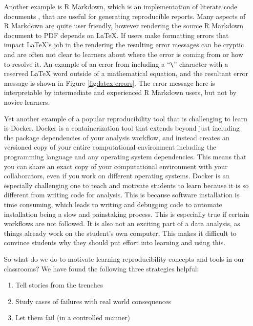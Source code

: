 \documentclass[
  12 pt,
]{paper}
\providecommand{\tightlist}{%
  \setlength{\itemsep}{0pt}\setlength{\parskip}{0pt}}
\begin{document}
Another example is R Markdown,
which is an implementation of literate code documents \autocite{knuth1984literate},
that are useful for generating reproducible reports.
Many aspects of R Markdown are quite user friendly,
however rendering the source R Markdown document to PDF depends on LaTeX.
If users make formatting errors that impact LaTeX's job in the rendering
the resulting error messages can be cryptic
and are often not clear to learners about where the error is coming from
or how to resolve it.
An example of an error from including a ``\texttt{\textbackslash{}}'' character with a reserved
LaTeX word outside of a mathematical equation,
and the resultant error message is shown in Figure \ref{fig:latex-errors}.
The error message here is interpretable by intermediate and experienced
R Markdown users, but not by novice learners.

Yet another example of a popular reproducibility tool that is challenging to learn is
Docker.
Docker is a containerization tool that extends beyond
just including the package dependencies of your analysis workflow,
and instead creates an versioned copy of your entire computational environment
including the programming language and any operating system dependencies.
This means that you can share an exact copy of your computational environment
with your collaborators, even if you work on different operating systems.
Docker is an especially challenging one to
teach and motivate students to learn
because it is so different from writing code for analysis.
This is because software installation is time consuming,
which leads to writing and debugging code to automate installation
being a slow and painstaking process.
This is especially true if certain workflows are not followed.
It is also not an exciting part of a data analysis,
as things already work on the student's own computer.
This makes it difficult to convince students why they should put effort into learning
and using this.

So what do we do to motivate learning reproducibility concepts and tools in our
classrooms? We have found the following three strategies helpful:

\begin{enumerate}
\def\labelenumi{\arabic{enumi}.}
\tightlist
\item
  Tell stories from the trenches
\item
  Study cases of failures with real world consequences
\item
  Let them fail (in a controlled manner)
\end{enumerate}
\end{document}
